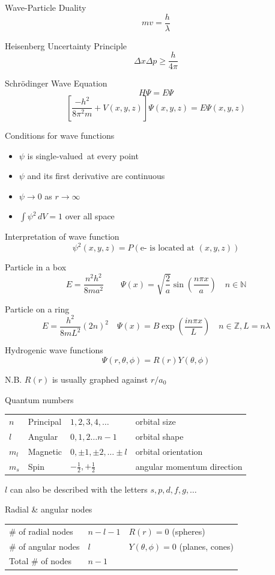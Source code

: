 \documentclass[10pt,landscape]{article}
\newcommand{\extraline}{\vspace{1em}}
\newcommand{\halfline}{\vspace{0.5em}}
\newcommand{\tableindent}{\hspace{1.5em}}
\begin{document}
\begin{multicols}{3}
Wave-Particle Duality  
\[  mv = \frac{h}{\lambda} \]


Heisenberg Uncertainty Principle
\[  \Delta x \Delta p \geq \frac{h}{4\pi} \]

Schrödinger Wave Equation
\[ H\Psi = E\Psi  \]
\[ \left[ \frac{-h^2}{8\pi^2m} +
V(x,y,z)\right] \Psi(x,y,z) = E\Psi(x,y,z)  \]
	
Conditions for wave functions
\begin{itemize}
	\item $\psi$ is single-valued at every point
	\item $\psi$ and its first derivative are continuous
	\item $\psi \to 0$ as $r \to \infty$
	\item $\int \psi^2 \, dV = 1$ over all space
\end{itemize}

Interpretation of wave function
\[ \psi^2(x,y,z) = P(\text{e- is located at }(x,y,z))  \]

Particle in a box
\[  E = \frac{n^2h^2}{8ma^2} 
\qquad
\Psi(x) = \sqrt{\frac{2}{a}} \sin\left( \frac{n\pi x}{a} \right)  \quad n \in \mathbb{N} \]

Particle on a ring
\[ E = \frac{h^2}{8mL^2} (2n)^2 
\quad
\Psi(x) = B \exp \left(\frac{in\pi x}{L} \right)
\quad n \in \mathbb{Z}, L = n\lambda  \]

Hydrogenic wave functions
\[ \Psi(r,\theta,\phi) = R(r) Y(\theta,\phi) \]

\tableindent N.B. $R(r)$ is usually graphed against $r/a_0$
\halfline

Quantum numbers 
\renewcommand{\arraystretch}{1.4}
\begin{tabular}{@{\tableindent}lllp{2.5cm}@{}}
$n$ & Principal & $1, 2, 3, 4, \ldots $ & \scriptsize{orbital size} \\
$l$ & Angular & $0, 1, 2 \dots  n-1 $ & \scriptsize{orbital shape} \\
$m_l$ & Magnetic & $0, \pm 1, \pm 2, \ldots \pm l $ & \scriptsize{orbital orientation} \\
$m_s$ & Spin & $-\frac{1}{2}, +\frac{1}{2} $ &  \scriptsize{angular momentum direction} \\
\end{tabular}

\halfline
\tableindent $l$ can also be described with the letters $s, p, d, f, g, \ldots$
\halfline

Radial \& angular nodes
\begin{tabular}{@{\tableindent}llp{2.4cm}@{}}
\# of radial nodes & $n-l-1$ & $R(r) = 0$ \scriptsize{(spheres)}\\
\# of angular nodes & $l$ &  $Y(\theta,\phi)=0$ \scriptsize{(planes, cones)} \\
Total \# of nodes & $n-1$ & 
\end{tabular}
\extraline


\end{multicols}
\end{document}
